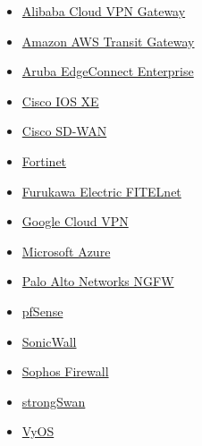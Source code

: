 \documentclass[
]{article}
\providecommand{\tightlist}{%
  \setlength{\itemsep}{0pt}\setlength{\parskip}{0pt}}\usepackage{longtable,booktabs,array}
\begin{document}
\begin{itemize}
\tightlist
\item
  \href{https://developers.cloudflare.com/magic-wan/configuration/manually/third-party/alibaba-cloud/}{Alibaba
  Cloud VPN Gateway}
\item
  \href{https://developers.cloudflare.com/magic-wan/configuration/manually/third-party/aws/}{Amazon
  AWS Transit Gateway}
\item
  \href{https://developers.cloudflare.com/magic-wan/configuration/manually/third-party/aruba-edgeconnect/}{Aruba
  EdgeConnect Enterprise}
\item
  \href{https://developers.cloudflare.com/magic-wan/configuration/manually/third-party/cisco-ios-xe/}{Cisco
  IOS XE}
\item
  \href{https://developers.cloudflare.com/magic-wan/configuration/manually/third-party/viptela/}{Cisco
  SD-WAN}
\item
  \href{https://developers.cloudflare.com/magic-wan/configuration/manually/third-party/fortinet/}{Fortinet}
\item
  \href{https://developers.cloudflare.com/magic-wan/configuration/manually/third-party/fitelnet/}{Furukawa
  Electric FITELnet}
\item
  \href{https://developers.cloudflare.com/magic-wan/configuration/manually/third-party/google/}{Google
  Cloud VPN}
\item
  \href{https://developers.cloudflare.com/magic-wan/configuration/manually/third-party/azure/}{Microsoft
  Azure}
\item
  \href{https://developers.cloudflare.com/magic-wan/configuration/manually/third-party/palo-alto/}{Palo
  Alto Networks NGFW}
\item
  \href{https://developers.cloudflare.com/magic-wan/configuration/manually/third-party/pfsense/}{pfSense}
\item
  \href{https://developers.cloudflare.com/magic-wan/configuration/manually/third-party/sonicwall/}{SonicWall}
\item
  \href{https://developers.cloudflare.com/magic-wan/configuration/manually/third-party/sophos-firewall/}{Sophos
  Firewall}
\item
  \href{https://developers.cloudflare.com/magic-wan/configuration/manually/third-party/strongswan/}{strongSwan}
\item
  \href{https://developers.cloudflare.com/magic-wan/configuration/manually/third-party/vyos/}{VyOS}
\end{itemize}
\end{document}
